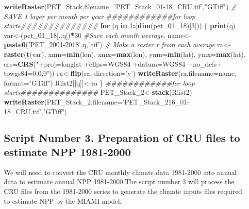 \documentclass[
  10pt,
  b5paper,
]{book}
\newenvironment{Shaded}{\begin{snugshade}}{\end{snugshade}}
\newcommand{\CommentTok}[1]{\textcolor[rgb]{0.56,0.35,0.01}{\textit{#1}}}
\newcommand{\ControlFlowTok}[1]{\textcolor[rgb]{0.13,0.29,0.53}{\textbf{#1}}}
\newcommand{\DataTypeTok}[1]{\textcolor[rgb]{0.13,0.29,0.53}{#1}}
\newcommand{\DecValTok}[1]{\textcolor[rgb]{0.00,0.00,0.81}{#1}}
\newcommand{\KeywordTok}[1]{\textcolor[rgb]{0.13,0.29,0.53}{\textbf{#1}}}
\newcommand{\NormalTok}[1]{#1}
\newcommand{\OperatorTok}[1]{\textcolor[rgb]{0.81,0.36,0.00}{\textbf{#1}}}
\newcommand{\StringTok}[1]{\textcolor[rgb]{0.31,0.60,0.02}{#1}}
\begin{document}
\begin{Shaded}
\begin{Highlighting}[]
\KeywordTok{writeRaster}\NormalTok{(PET_Stack,}\DataTypeTok{filename=}\StringTok{'PET_Stack_01-18_CRU.tif'}\NormalTok{,}\StringTok{"GTiff"}\NormalTok{)}
 \CommentTok{# SAVE 1 layer per month per year}
\CommentTok{############for loop starts##############}
 \ControlFlowTok{for}\NormalTok{ (q }\ControlFlowTok{in} \DecValTok{1}\OperatorTok{:}\NormalTok{(}\KeywordTok{dim}\NormalTok{(pet_}\DecValTok{01}\NormalTok{_}\DecValTok{18}\NormalTok{)[}\DecValTok{3}\NormalTok{])) \{}
\KeywordTok{print}\NormalTok{(q)}
\NormalTok{var<-(pet_}\DecValTok{01}\NormalTok{_}\DecValTok{18}\NormalTok{[,,q])}\OperatorTok{*}\DecValTok{30}
 \CommentTok{#Save each month average. }
\NormalTok{ name<-}\KeywordTok{paste0}\NormalTok{(}\StringTok{'PET_2001-2018'}\NormalTok{,q,}\StringTok{'.tif'}\NormalTok{)}
 \CommentTok{# Make a raster r from each average}
\NormalTok{ra<-}\StringTok{ }\KeywordTok{raster}\NormalTok{(}\KeywordTok{t}\NormalTok{(var), }\DataTypeTok{xmn=}\KeywordTok{min}\NormalTok{(lon), }\DataTypeTok{xmx=}\KeywordTok{max}\NormalTok{(lon), }\DataTypeTok{ymn=}\KeywordTok{min}\NormalTok{(lat), }\DataTypeTok{ymx=}\KeywordTok{max}\NormalTok{(lat), }\DataTypeTok{crs=}\KeywordTok{CRS}\NormalTok{(}\StringTok{"+proj=longlat +ellps=WGS84 +datum=WGS84 +no_defs+ towgs84=0,0,0"}\NormalTok{))}
\NormalTok{ra<-}\KeywordTok{flip}\NormalTok{(ra, }\DataTypeTok{direction=}\StringTok{'y'}\NormalTok{)}
\KeywordTok{writeRaster}\NormalTok{(ra,}\DataTypeTok{filename=}\NormalTok{name, }\DataTypeTok{format=}\StringTok{"GTiff"}\NormalTok{)}
\NormalTok{Rlist2[[q]]<-ra}
\NormalTok{\}}
\CommentTok{############for loop starts##############}
\NormalTok{PET_Stack_}\DecValTok{2}\NormalTok{<-}\KeywordTok{stack}\NormalTok{(Rlist2)}
\KeywordTok{writeRaster}\NormalTok{(PET_Stack_}\DecValTok{2}\NormalTok{,}\DataTypeTok{filename=}\StringTok{'PET_Stack_216_01-18_CRU.tif'}\NormalTok{,}\StringTok{"GTiff"}\NormalTok{) }
\end{Highlighting}
\end{Shaded}

\hypertarget{script-number-3.-preparation-of-cru-files-to-estimate-npp-1981-2000}{%
\subsection{Script Number 3. Preparation of CRU files to estimate NPP 1981-2000}\label{script-number-3.-preparation-of-cru-files-to-estimate-npp-1981-2000}}

We will need to convert the CRU monthly climate data 1981-2000 into annual data to estimate annual NPP 1981-2000.The script number 3 will process the CRU files from the 1981-2000 series to generate the climate inputs files required to estimate NPP by the MIAMI model.
\end{document}
